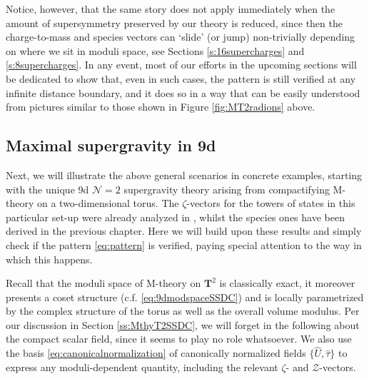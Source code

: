 Notice, however, that the same story does not apply immediately when the amount of supersymmetry preserved by our theory is reduced, since then the charge-to-mass and species vectors can `slide' (or jump) non-trivially depending on where we sit in moduli space, see Sections \ref{s:16supercharges} and \ref{s:8supercharges}. In any event, most of our efforts in the upcoming sections will be dedicated to show that, even in such cases, the pattern is still verified at any infinite distance boundary, and it does so in a way that can be easily understood from pictures similar to those shown in Figure \ref{fig:MT2radions} above.	
	
\subsection{Maximal supergravity in 9d}
\label{ss:9d}
	
Next, we will illustrate the above general scenarios in concrete examples, starting with the unique 9d $\mathcal{N}=2$ supergravity theory arising from compactifying M-theory on a two-dimensional torus. The $\zeta$-vectors for the towers of states in this particular set-up were already analyzed in \cite{Etheredge:2022opl}, whilst the species ones have been derived in the previous chapter. Here we will build upon these results and simply check if the pattern \eqref{eq:pattern} is verified, paying special attention to the way in which this happens.

Recall that the moduli space of M-theory on $\mathbf{T}^2$ is classically exact, it moreover presents a coset structure (c.f. \eqref{eq:9dmodspaceSSDC}) and is locally parametrized by the complex structure of the torus as well as the overall volume modulus. Per our discussion in Section \ref{ss:MthyT2SSDC}, we will forget in the following about the compact scalar field, since it seems to play no role whatsoever. We also use the basis \eqref{eq:canonicalnormalization} of canonically normalized fields $\{\hat U, \hat \tau \}$ to express any moduli-dependent quantity, including the relevant $\zeta$- and $\mathcal{Z}$-vectors.

